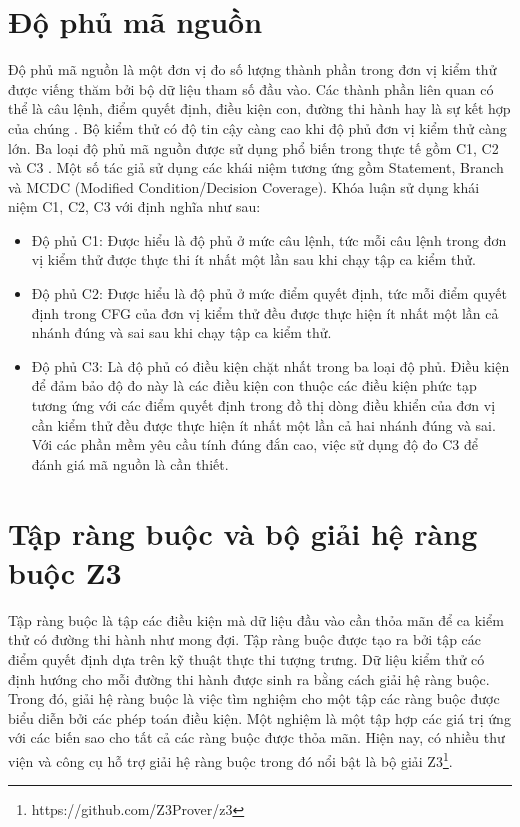 \section{Độ phủ mã nguồn} \label{sec:coverage}
Độ phủ mã nguồn là một đơn vị đo số lượng thành phần trong đơn vị kiểm thử được viếng thăm bởi bộ dữ liệu tham số đầu vào. Các thành phần liên quan có thể là câu lệnh, điểm quyết định, điều kiện con, đường thi hành hay là sự kết hợp của chúng \cite{GiaoTrinhKiemThu}. Bộ kiểm thử có độ tin cậy càng cao khi độ phủ đơn vị kiểm thử càng lớn. Ba loại độ phủ mã nguồn được sử dụng phổ biến trong thực tế gồm C1, C2 và C3 \cite{GiaoTrinhKiemThu}. Một số tác giả sử dụng các khái niệm tương ứng gồm Statement, Branch và MCDC (Modified Condition/Decision Coverage). Khóa luận sử dụng khái niệm C1, C2, C3 với định nghĩa như sau:
\begin{itemize}
	\item Độ phủ C1: Được hiểu là độ phủ ở mức câu lệnh, tức mỗi câu lệnh trong đơn vị kiểm thử được thực thi ít nhất một lần sau khi chạy tập ca kiểm thử.
	
	\item Độ phủ C2: Được hiểu là độ phủ ở mức điểm quyết định, tức mỗi điểm quyết định trong CFG của đơn vị kiểm thử đều được thực hiện ít nhất một lần cả nhánh đúng và sai sau khi chạy tập ca kiểm thử.
	
	\item Độ phủ C3: Là độ phủ có điều kiện chặt nhất trong ba loại độ phủ. Điều kiện để đảm bảo độ đo này là các điều kiện con thuộc các điều kiện phức tạp tương ứng với các điểm quyết định trong đồ thị dòng điều khiển của đơn vị cần kiểm thử đều được thực hiện ít nhất một lần cả hai nhánh đúng và sai. Với các phần mềm yêu cầu tính đúng đắn cao, việc sử dụng độ đo C3 để đánh giá mã nguồn là cần thiết.
\end{itemize}

\section{Tập ràng buộc và bộ giải hệ ràng buộc Z3} \label{sec:z3}
Tập ràng buộc là tập các điều kiện mà dữ liệu đầu vào cần thỏa mãn để ca kiểm thử có đường thi hành như mong đợi. Tập ràng buộc được tạo ra bởi tập các điểm quyết định dựa trên kỹ thuật thực thi tượng trưng. Dữ liệu kiểm thử có định hướng cho mỗi đường thi hành được sinh ra bằng cách giải hệ ràng buộc. Trong đó, giải hệ ràng buộc là việc tìm nghiệm cho một tập các ràng buộc được biểu diễn bởi các phép toán điều kiện. Một nghiệm là một tập hợp các giá trị ứng với các biến sao cho tất cả các ràng buộc được thỏa mãn\cite{ref-constraints}. Hiện nay, có nhiều thư viện và công cụ hỗ trợ giải hệ ràng buộc trong đó nổi bật là bộ giải Z3\footnote{https://github.com/Z3Prover/z3}.

